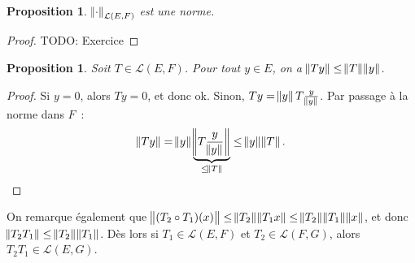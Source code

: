 \documentclass{report}
\newcommand{\TODO}{TODO}
\newtheorem{prp}[thm]{Proposition}
\theoremstyle{definition}
\theoremstyle{remark}
\begin{document}
\begin{prp} $\norm \cdot_{\mathcal L(E, F)}$ est une norme.
\end{prp}

\begin{proof} \TODO: Exercice
\end{proof}

\begin{prp} Soit $T \in \mathcal L(E, F)$. Pour tout $y \in E$, on a $\norm {Ty} \leq \norm T\norm y$.
\end{prp}

\begin{proof} Si $y = 0$, alors $Ty = 0$, et donc ok. Sinon, $Ty = \norm yT\frac y{\norm y}$. Par passage à la norme dans $F$~:
\[\norm {Ty} = \norm y \underbrace {\norm {T\frac y{\norm y}}}_{\leq \norm T} \leq \norm y\norm T.\]
\end{proof}

On remarque également que $\norm {(T_2 \circ T_1)(x)} \leq \norm {T_2}\norm {T_1x} \leq \norm {T_2}\norm {T_1}\norm x$, et donc $\norm {T_2T_1} \leq \norm {T_2}\norm {T_1}$. Dès lors
si $T_1 \in \mathcal L(E, F)$ et $T_2 \in \mathcal L(F, G)$, alors $T_2T_1 \in \mathcal L(E, G)$.
\end{document}
